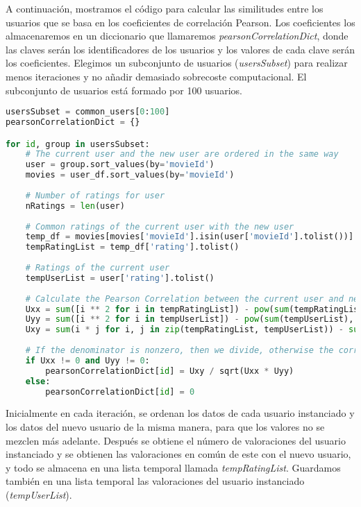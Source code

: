 \documentclass{uimppracticas}
\begin{document}
A continuación, mostramos el código para calcular las similitudes entre los usuarios que se basa en los coeficientes de correlación Pearson. Los coeficientes los almacenaremos en un diccionario que llamaremos \textit{pearsonCorrelationDict}, donde las claves serán los identificadores de los usuarios y los valores de cada clave serán los coeficientes. Elegimos un subconjunto de usuarios (\textit{usersSubset}) para realizar menos iteraciones y no añadir demasiado sobrecoste computacional. El subconjunto de usuarios está formado por 100 usuarios.

\begin{lstlisting}[language=python, basicstyle=\footnotesize]
usersSubset = common_users[0:100]	
pearsonCorrelationDict = {}

for id, group in usersSubset:
	# The current user and the new user are ordered in the same way
	user = group.sort_values(by='movieId')
	movies = user_df.sort_values(by='movieId')
	
	# Number of ratings for user
	nRatings = len(user)
	
	# Common ratings of the current user with the new user
	temp_df = movies[movies['movieId'].isin(user['movieId'].tolist())]
	tempRatingList = temp_df['rating'].tolist()
	
	# Ratings of the current user
	tempUserList = user['rating'].tolist()
	
	# Calculate the Pearson Correlation between the current user and new user
	Uxx = sum([i ** 2 for i in tempRatingList]) - pow(sum(tempRatingList), 2) / float(nRatings)
	Uyy = sum([i ** 2 for i in tempUserList]) - pow(sum(tempUserList), 2) / float(nRatings)
	Uxy = sum(i * j for i, j in zip(tempRatingList, tempUserList)) - sum(tempRatingList) * sum(tempUserList) / float(nRatings)
	
	# If the denominator is nonzero, then we divide, otherwise the correlation is 0
	if Uxx != 0 and Uyy != 0:
		pearsonCorrelationDict[id] = Uxy / sqrt(Uxx * Uyy)
	else:
		pearsonCorrelationDict[id] = 0
\end{lstlisting}

Inicialmente en cada iteración, se ordenan los datos de cada usuario instanciado y los datos del nuevo usuario de la misma manera, para que los valores no se mezclen más adelante. Después se obtiene el número de valoraciones del usuario instanciado y se obtienen las valoraciones en común de este con el nuevo usuario, y todo se almacena en una lista temporal llamada \textit{tempRatingList}. Guardamos también en una lista temporal las valoraciones del usuario instanciado (\textit{tempUserList}). 
\end{document}
